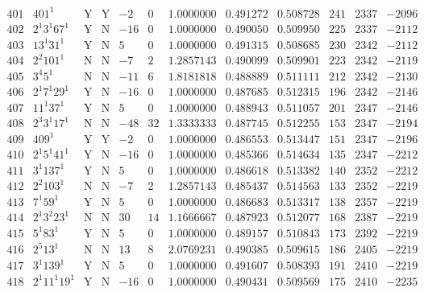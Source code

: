 \documentclass[11pt,reqno,a4letter]{article}
\numberwithin{figure}{section}
\numberwithin{table}{section}
\theoremstyle{plain}
\numberwithin{theorem}{section}
\theoremstyle{definition}
\begin{document}
\begin{table}[h!]
\begin{equation*}
{\begin{array}{cc|cc|ccc|cc|ccc}
 401 & 401^1 & \text{Y} & \text{Y} & -2 & 0 & 1.0000000 & 0.491272 & 0.508728 & 241 & 2337 & -2096 \\
 402 & 2^1 3^1 67^1 & \text{Y} & \text{N} & -16 & 0 & 1.0000000 & 0.490050 & 0.509950 & 225 & 2337 & -2112 \\
 403 & 13^1 31^1 & \text{Y} & \text{N} & 5 & 0 & 1.0000000 & 0.491315 & 0.508685 & 230 & 2342 & -2112 \\
 404 & 2^2 101^1 & \text{N} & \text{N} & -7 & 2 & 1.2857143 & 0.490099 & 0.509901 & 223 & 2342 & -2119 \\
 405 & 3^4 5^1 & \text{N} & \text{N} & -11 & 6 & 1.8181818 & 0.488889 & 0.511111 & 212 & 2342 & -2130 \\
 406 & 2^1 7^1 29^1 & \text{Y} & \text{N} & -16 & 0 & 1.0000000 & 0.487685 & 0.512315 & 196 & 2342 & -2146 \\
 407 & 11^1 37^1 & \text{Y} & \text{N} & 5 & 0 & 1.0000000 & 0.488943 & 0.511057 & 201 & 2347 & -2146 \\
 408 & 2^3 3^1 17^1 & \text{N} & \text{N} & -48 & 32 & 1.3333333 & 0.487745 & 0.512255 & 153 & 2347 & -2194 \\
 409 & 409^1 & \text{Y} & \text{Y} & -2 & 0 & 1.0000000 & 0.486553 & 0.513447 & 151 & 2347 & -2196 \\
 410 & 2^1 5^1 41^1 & \text{Y} & \text{N} & -16 & 0 & 1.0000000 & 0.485366 & 0.514634 & 135 & 2347 & -2212 \\
 411 & 3^1 137^1 & \text{Y} & \text{N} & 5 & 0 & 1.0000000 & 0.486618 & 0.513382 & 140 & 2352 & -2212 \\
 412 & 2^2 103^1 & \text{N} & \text{N} & -7 & 2 & 1.2857143 & 0.485437 & 0.514563 & 133 & 2352 & -2219 \\
 413 & 7^1 59^1 & \text{Y} & \text{N} & 5 & 0 & 1.0000000 & 0.486683 & 0.513317 & 138 & 2357 & -2219 \\
 414 & 2^1 3^2 23^1 & \text{N} & \text{N} & 30 & 14 & 1.1666667 & 0.487923 & 0.512077 & 168 & 2387 & -2219 \\
 415 & 5^1 83^1 & \text{Y} & \text{N} & 5 & 0 & 1.0000000 & 0.489157 & 0.510843 & 173 & 2392 & -2219 \\
 416 & 2^5 13^1 & \text{N} & \text{N} & 13 & 8 & 2.0769231 & 0.490385 & 0.509615 & 186 & 2405 & -2219 \\
 417 & 3^1 139^1 & \text{Y} & \text{N} & 5 & 0 & 1.0000000 & 0.491607 & 0.508393 & 191 & 2410 & -2219 \\
 418 & 2^1 11^1 19^1 & \text{Y} & \text{N} & -16 & 0 & 1.0000000 & 0.490431 & 0.509569 & 175 & 2410 & -2235 \\

\end{array}}
\end{equation*}
\end{table}
\end{document}
